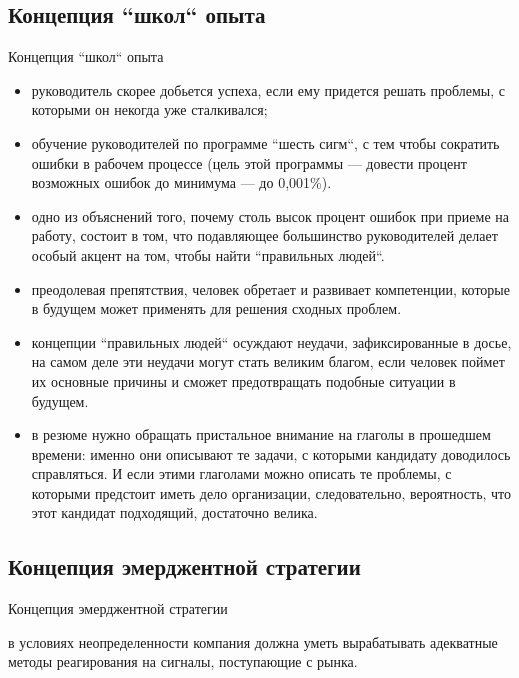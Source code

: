 \documentclass[_Venture_p3.tex]{subfiles}
\begin{document}
\subsection{Концепция ``школ`` опыта}
\begin{frame}{Концепция ``школ`` опыта}
\begin{itemize}
	\small
	\item руководитель скорее добьется успеха, если ему придется решать проблемы, с которыми он некогда уже сталкивался;
	\item обучение руководителей по программе ``шесть сигм``, с тем чтобы сократить ошибки в рабочем процессе (цель этой программы — довести процент возможных ошибок до минимума — до 0,001\%).
	\item одно из объяснений того, почему столь высок процент ошибок при приеме на работу, состоит в том, что подавляющее большинство руководителей делает особый акцент на том, чтобы найти ``правильных людей``. 
\end{itemize}
\end{frame}

\begin{frame}
\begin{itemize}
	\footnotesize
	\item преодолевая препятствия, человек обретает и развивает компетенции, которые в будущем может применять для решения сходных проблем. 
	\item концепции ``правильных людей`` осуждают неудачи, зафиксированные в досье, на самом деле эти неудачи могут стать великим благом, если человек поймет их основные причины и сможет предотвращать подобные ситуации в будущем.
	\item в резюме нужно обращать пристальное внимание на глаголы в прошедшем времени: именно они описывают те задачи, с которыми кандидату доводилось справляться. И если этими глаголами можно описать те проблемы, с которыми предстоит иметь дело организации, следовательно, вероятность, что этот кандидат подходящий, достаточно велика.
\end{itemize}
\end{frame}

\subsection{Концепция эмерджентной стратегии}
\begin{frame}{Концепция эмерджентной стратегии}
\begin{block}{}
	\quad в условиях неопределенности компания должна уметь вырабатывать адекватные методы реагирования на сигналы, поступающие с рынка.
\end{block}
\end{frame}
\end{document}
